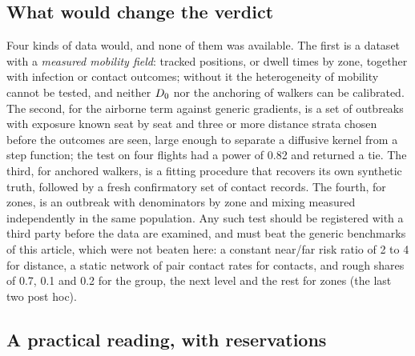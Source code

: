 \subsection{What would change the verdict}\label{s9_discussion:sec:next}

Four kinds of data would, and none of them was available. The first is a dataset with a \emph{measured mobility
field}: tracked positions, or dwell times by zone, together with infection or contact outcomes; without it the
heterogeneity of mobility cannot be tested, and neither $D_0$ nor the anchoring of walkers can be calibrated. The
second, for the airborne term against generic gradients, is a set of outbreaks with exposure known seat by seat
and three or more distance strata chosen before the outcomes are seen, large enough to separate a diffusive kernel
from a step function; the test on four flights had a power of 0.82 and returned a tie. The third, for anchored
walkers, is a fitting procedure that recovers its own synthetic truth, followed by a fresh confirmatory set of
contact records. The fourth, for zones, is an outbreak with denominators by zone and mixing measured independently
in the same population. Any such test should be registered with a third party before the data are examined, and
must beat the generic benchmarks of this article, which were not beaten here: a constant near/far risk ratio of 2
to 4 for distance, a static network of pair contact rates for contacts, and rough shares of 0.7, 0.1 and 0.2 for
the group, the next level and the rest for zones (the last two post hoc).

\subsection{A practical reading, with reservations}\label{s9_discussion:sec:practice}


